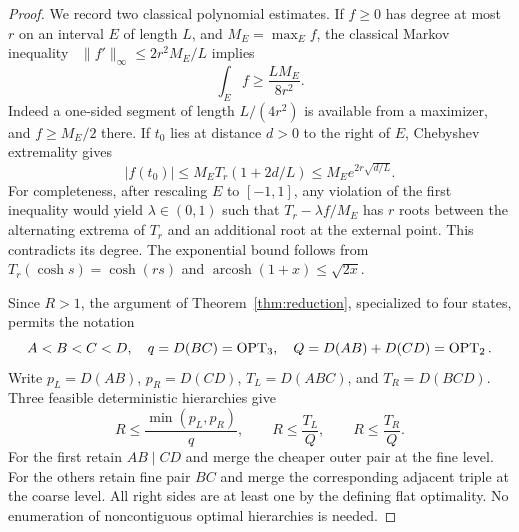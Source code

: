 \begin{proof}
We record two classical polynomial estimates. If $f\ge0$ has degree at
most $r$ on an interval $E$ of length $L$, and $M_E=\max_Ef$, the classical Markov
inequality~\cite{shadrin} $\|f'\|_\infty\le2r^2M_E/L$ implies
\begin{equation}
 \int_E f\ge\frac{LM_E}{8r^2}.
 \label{eq:markov}
\end{equation}
Indeed a one-sided segment of length $L/(4r^2)$ is available from a
maximizer, and $f\ge M_E/2$ there. If $t_0$ lies at distance $d>0$ to
the right of $E$, Chebyshev extremality gives
\begin{equation}
 |f(t_0)|\le M_E T_r(1+2d/L)
 \le M_Ee^{2r\sqrt{d/L}}.
 \label{eq:cheb}
\end{equation}
For completeness, after rescaling $E$ to $[-1,1]$, any violation of the
first inequality would yield $\lambda\in(0,1)$ such that
$T_r-\lambda f/M_E$ has $r$ roots between the alternating extrema of
$T_r$ and an additional root at the external point. This contradicts
its degree. The exponential bound follows from
$T_r(\cosh s)=\cosh(rs)$ and
$\operatorname{arcosh}(1+x)\le\sqrt{2x}$.

Since $R>1$, the argument of Theorem~\ref{thm:reduction}, specialized to
four states, permits the notation
\[
 A<B<C<D,\quad q=D(BC)=\operatorname{OPT}_3,\quad
 Q=D(AB)+D(CD)=\operatorname{OPT}_2.
\]
Write $p_L=D(AB)$, $p_R=D(CD)$, $T_L=D(ABC)$, and $T_R=D(BCD)$.
Three feasible deterministic hierarchies give
\begin{equation}
 R\le\frac{\min(p_L,p_R)}q,\qquad
 R\le\frac{T_L}Q,\qquad R\le\frac{T_R}Q.
 \label{eq:candidates}
\end{equation}
For the first retain $AB\mid CD$ and merge the cheaper outer pair at
the fine level. For the others retain fine pair $BC$ and merge the
corresponding adjacent triple at the coarse level. All right sides
are at least one by the defining flat optimality. No enumeration of
noncontiguous optimal hierarchies is needed.


\end{proof}
